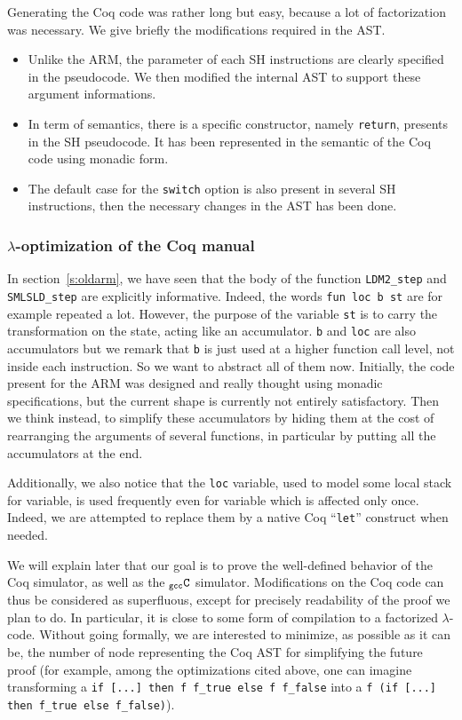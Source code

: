 \documentclass[a4paper, 11pt]{article}
\newcommand{\gccC}{$_{\tt gcc}{\tt C}$\xspace}
\begin{document}
\hspace{1ex}

Generating the Coq code was rather long but easy, because a lot of factorization was necessary. We give briefly the modifications required in the AST.
\begin{itemize}
\item Unlike the ARM, the parameter of each SH instructions are clearly specified in the pseudocode. We then modified the internal AST to support these argument informations.
\item In term of semantics, there is a specific constructor, namely \verb|return|, presents in the SH pseudocode. It has been represented in the semantic of the Coq code using monadic form.
\item The default case for the \verb|switch| option is also present in several SH instructions, then the necessary changes in the AST has been done.
\end{itemize}
    \subsubsection{$\lambda$-optimization of the Coq manual}
In section~\ref{s:oldarm}, we have seen that the body of the function \verb|LDM2_step| and \verb|SMLSLD_step| are explicitly informative. Indeed, the words \verb|fun loc b st| are for example repeated a lot. However, the purpose of the variable \verb|st| is to carry the transformation on the state, acting like an accumulator. \verb|b| and \verb|loc| are also accumulators but we remark that \verb|b| is just used at a higher function call level, not inside each instruction. So we want to abstract all of them now. Initially, the code present for the ARM was designed and really thought using monadic specifications, but the current shape is currently not entirely satisfactory. Then we think instead, to simplify these accumulators by hiding them at the cost of rearranging the arguments of several functions, in particular by putting all the accumulators at the end.

Additionally, we also notice that the \verb|loc| variable, used to model some local stack for variable, is used frequently even for variable which is affected only once. Indeed, we are attempted to replace them by a native Coq ``\verb|let|'' construct when needed.

\hspace{1ex}

We will explain later that our goal is to prove the well-defined behavior of the Coq simulator, as well as the \gccC simulator. Modifications on the Coq code can thus be considered as superfluous, except for precisely readability of the proof we plan to do. In particular, it is close to some form of compilation to a factorized $\lambda$-code. Without going formally, we are interested to minimize, as possible as it can be, the number of node representing the Coq AST for simplifying the future proof (for example, among the optimizations cited above, one can imagine transforming a {\tt if [...] then f f\_true else f f\_false} into a {\tt f (if [...] then f\_true else f\_false)}).
\end{document}
